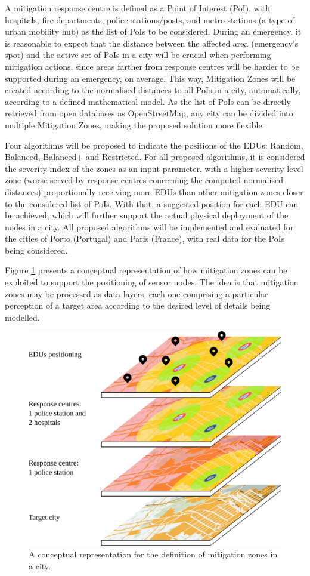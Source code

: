 \begin{refsection}
A mitigation response centre is defined as a Point of Interest (PoI), with hospitals, fire departments, police stations/posts, and metro stations (a type of urban mobility hub) as the list of PoIs to be considered. During an emergency, it is reasonable to expect that the distance between the affected area (emergency's spot) and the active set of PoIs in a city will be crucial when performing mitigation actions, since areas farther from response centres will be harder to be supported during an emergency, on average. This way, Mitigation Zones will be created according to the normalised distances to all PoIs in a city, automatically, according to a defined mathematical model. As the list of PoIs can be directly retrieved from open databases as OpenStreetMap, any city can be divided into multiple Mitigation Zones, making the proposed solution more flexible.

Four algorithms will be proposed to indicate the positions of the EDUs: Random, Balanced, Balanced+ and Restricted. For all proposed algorithms, it is considered the severity index of the zones as an input parameter, with a higher severity level zone (worse served by response centres concerning the computed normalised distances) proportionally receiving more EDUs than other mitigation zones closer to the considered list of PoIs. With that, a suggested position for each EDU can be achieved, which will further support the actual physical deployment of the nodes in a city. All proposed algorithms will be implemented and evaluated for the cities of Porto (Portugal) and Paris (France), with real data for the PoIs being considered. 

Figure \ref{fig:smartcity} presents a conceptual representation of how mitigation zones can be exploited to support the positioning of sensor nodes. The idea is that mitigation zones may be processed as data layers, each one comprising a particular perception of a target area according to the desired level of details being modelled.

\begin{figure}[htbp!]
    \centering
    \includegraphics[width=0.7\linewidth]{Chapters/2-EDUs/images/map_layers.pdf}
    \caption{A conceptual representation for the definition of mitigation zones in a city.}
    \label{fig:smartcity}
\end{figure}


\end{refsection}
